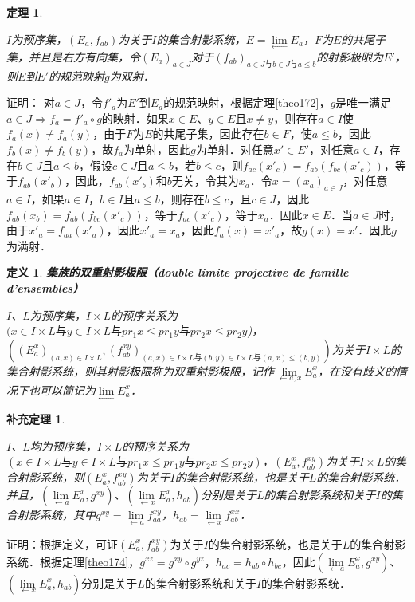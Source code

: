 \documentclass[12pt, a4paper, oneside]{book}
\newtheorem{theo}{定理}
\newtheorem{cor}{补充定理}
\newtheorem{de}{定义}
\begin{document}
			\begin{theo}\label{theo177}
				\hfill\par
				$I$为预序集，$(E_a, f_{ab})$为关于$I$的集合射影系统，$E=\lim\limits_\gets E_a$，$F$为$E$的共尾子集，并且是右方有向集，令$(E_a)_{a\in J}$对于$(f_{ab})_{a\in J\text{与}b\in J\text{与}a\leq b}$的射影极限为$E'$，则$E$到$E'$的规范映射$g$为双射．
			\end{theo}
			证明：
			对$a\in J$，令${f'}_a$为$E'$到$E_a$的规范映射，根据定理\ref{theo172}，$g$是唯一满足$a\in J\Rightarrow f_a={f'}_a\circ g$的映射．如果$x\in E$、$y\in E$且$x\neq y$，则存在$a\in I$使$f_a(x)\neq f_a(y)$，由于$F$为$E$的共尾子集，因此存在$b\in F$，使$a\leq b$，因此$f_b(x)\neq f_b(y)$，故$f_a$为单射，因此$g$为单射．对任意$x'\in E'$，对任意$a\in I$，存在$b\in J$且$a\leq b$，假设$c\in J$且$a\leq b$，若$b\leq c$，则$f_{ac}({x'}_c)=f_{ab}(f_{bc}({x'}_c))$，等于$f_{ab}({x'}_b)$，因此，$f_{ab}({x'}_b)$和$b$无关，令其为$x_a$．令$x=(x_a)_{a\in J}$，对任意$a\in I$，如果$a\in I$，$b\in I$且$a\leq b$，则存在$b\leq c$，且$c\in J$，因此$f_{ab}(x_b)=f_{ab}(f_{bc}({x'}_c))$，等于$f_{ac}({x'}_c)$，等于$x_a$．因此$x\in E$．当$a\in J$时，由于${x'}_a=f_{aa}({x'}_a)$，因此${x'}_a=x_a$，因此$f_a(x)={x'}_a$，故$g(x)=x'$．因此$g$为满射．
			
			\begin{de}
				\textbf{集族的双重射影极限（double limite projective de famille d'ensembles）}
				\par
				$I$、$L$为预序集，$I\times L$的预序关系为$(x\in I\times L\text{与}y\in I\times L\text{与}pr_1x\leq pr_1y\text{与}pr_2x\leq pr_2y$)，$((E_a^x)_{(a, x)\in I\times L}, (f_{ab}^{xy})_{(a, x)\in I\times L\text{与}(b, y)\in I\times L\text{与}(a, x)\leq (b, y)})$为关于$I\times L$的集合射影系统，则其射影极限称为双重射影极限，记作$\lim\limits_{\gets a, x}E_a^x$，在没有歧义的情况下也可以简记为$\lim\limits_\gets E_a^x$．
			\end{de}
			
			\begin{cor}\label{cor420}
				\hfill\par
				$I$、$L$均为预序集，$I\times L$的预序关系为$(x\in I\times L\text{与}y\in I\times L\text{与}pr_1x\leq pr_1y\text{与}pr_2x\leq pr_2y)$，$(E_a^x, f_{ab}^{xy})$为关于$I\times L$的集合射影系统，则$(E_a^x, f_{ab}^{xy})$为关于$I$的集合射影系统，也是关于$L$的集合射影系统．并且，$(\lim\limits_{\gets a}E_a^x, g^{xy})$、$(\lim\limits_{\gets x}E_a^x, h_{ab})$分别是关于$L$的集合射影系统和关于$I$的集合射影系统，其中$g^{xy}= \lim\limits_{\gets a}f_{aa}^{xy}$，$h_{ab}= \lim\limits_{\gets x}f_{ab}^{xx}$．
			\end{cor}
			证明：根据定义，可证$(E_a^x, f_{ab}^{xy})$为关于$I$的集合射影系统，也是关于$L$的集合射影系统．根据定理\ref{theo174}，$g^{xz}=g^{xy}\circ g^{yz}$，$h_{ac}=h_{ab}\circ h_{bc}$，因此$(\lim\limits_{\gets a}E_a^x, g^{xy})$、$(\lim\limits_{\gets x}E_a^x, h_{ab})$分别是关于$L$的集合射影系统和关于$I$的集合射影系统．
					
\end{document}
